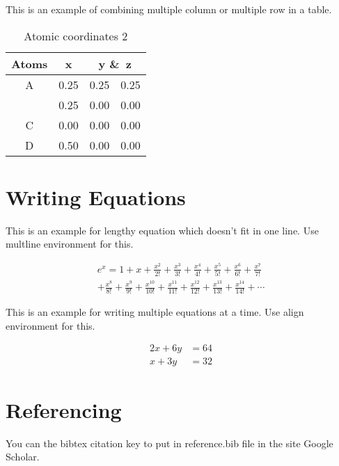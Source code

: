This is an example of combining multiple column or multiple row in a table.

\begin{table}[H]
	\centering
\begin{tabular}{|c|c|c|c|}
	\hline
	Atoms & x & \multicolumn{2}{c|}{y \&\ z}\\
	\hline
	A  & 0.25 & 0.25 & 0.25\\
	\cline{2-4} %
	{} & 0.25 & 0.00 & 0.00\\ %
	\hline
	C  & 0.00 & 0.00 & 0.00\\
	\hline
	D  & 0.50 & 0.00 & 0.00\\
	\hline
\end{tabular}
	\caption[Atomic coordinates 2]{Atomic coordinates 2}
\end{table}

\section{Writing Equations}

This is an example for lengthy equation which doesn't fit in one line.
Use multline environment for this.

\begin{multline}
	e^x = 1+x+\frac{x^2}{2!}+\frac{x^3}{3!}+\frac{x^4}{4!}+\frac{x^5}{5!}
	+\frac{x^6}{6!}+\frac{x^7}{7!}\\+\frac{x^8}{8!}+\frac{x^9}{9!}
	+\frac{x^{10}}{10!}+\frac{x^{11}}{11!}+\frac{x^{12}}{12!}
	+\frac{x^{13}}{13!}+\frac{x^{14}}{14!}+\cdots
	\label{eq:expansion}
\end{multline}

This is an example for writing multiple equations at a time.
Use align environment for this.

\begin{align}
	2x+6y&=64\\
	x+3y&=32
	\label{eq:xy}
\end{align}

\section{Referencing}

You can the bibtex citation key to put in reference.bib file in the site
Google Scholar.\\

